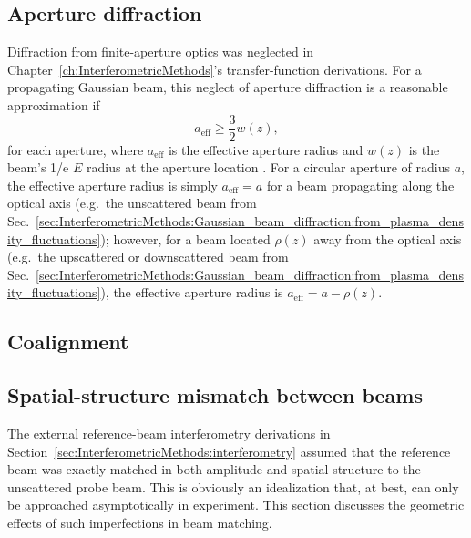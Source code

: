 \subsection{Aperture diffraction}
Diffraction from finite-aperture optics was neglected in
Chapter~\ref{ch:InterferometricMethods}'s
transfer-function derivations.
For a propagating Gaussian beam,
this neglect of aperture diffraction is a reasonable approximation if
\begin{equation}
  a_{\text{eff}} \geq \frac{3}{2} w(z),
  \label{eq:DesignConsiderations:aperture_radius_for_minimal_diffraction}
\end{equation}
for each aperture, where
$a_{\text{eff}}$ is the effective aperture radius and
$w(z)$ is the beam's 1/e $E$ radius at the aperture location
\cite{campbell_josa69, rost_diffraction_pc14}.
For a circular aperture of radius $a$,
the effective aperture radius is simply $a_{\text{eff}} = a$
for a beam propagating along the optical axis
(e.g.\ the unscattered beam from
Sec.~\ref{sec:InterferometricMethods:Gaussian_beam_diffraction:from_plasma_density_fluctuations});
however, for a beam located $\rho(z)$ away from the optical axis
(e.g.\ the upscattered or downscattered beam from
Sec.~\ref{sec:InterferometricMethods:Gaussian_beam_diffraction:from_plasma_density_fluctuations}),
the effective aperture radius is $a_{\text{eff}} = a - \rho(z)$.


\subsection{Coalignment}


\subsection{Spatial-structure mismatch between beams}
\label{sec:DesignConsiderations:geometric:beam_mismatch}
The external reference-beam interferometry derivations
in Section~\ref{sec:InterferometricMethods:interferometry}
assumed that the reference beam was exactly matched
in both amplitude and spatial structure
to the unscattered probe beam.
This is obviously an idealization
that, at best, can only be approached asymptotically in experiment.
This section discusses the geometric effects
of such imperfections in beam matching.

